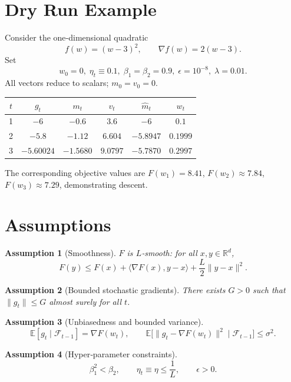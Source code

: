 \documentclass{article}
\newtheorem{assumption}{Assumption}
\newcommand{\E}{\mathbb{E}}
\newcommand{\R}{\mathbb{R}}
\begin{document}
\section*{Dry Run Example}
Consider the one‑dimensional quadratic
\[
f(w)=(w-3)^2,\qquad \nabla f(w)=2(w-3).
\]
Set
\[
w_0=0,\;\eta_t\equiv0.1,\;
\beta_1=\beta_2=0.9,\;
\epsilon=10^{-8},\;
\lambda=0.01.
\]
All vectors reduce to scalars; $m_0=v_0=0$.

\begin{center}
\begin{tabular}{c|c|c|c|c|c}
$t$ & $g_t$ & $m_t$ & $v_t$ & $\hat m_t$ & $w_t$ \\ \hline
1 & $-6$ & $-0.6$ & $3.6$ & $-6$ & $0.1$ \\
2 & $-5.8$ & $-1.12$ & $6.604$ & $-5.8947$ & $0.1999$ \\
3 & $-5.60024$ & $-1.5680$ & $9.0797$ & $-5.7870$ & $0.2997$
\end{tabular}
\end{center}
The corresponding objective values are $F(w_1)=8.41$, $F(w_2)\approx7.84$, $F(w_3)\approx7.29$, demonstrating descent.

\section*{Assumptions}
\begin{assumption}[Smoothness]\label{ass:smooth}
$F$ is $L$‑smooth: for all $x,y\in\R^d$,
\[
F(y)\le F(x)+\langle \nabla F(x),y-x\rangle+\frac{L}{2}\|y-x\|^2 .
\]
\end{assumption}
\begin{assumption}[Bounded stochastic gradients]\label{ass:bound}
There exists $G>0$ such that $\|g_t\|\le G$ almost surely for all $t$.
\end{assumption}
\begin{assumption}[Unbiasedness and bounded variance]\label{ass:var}
\[
\E[g_t\mid\mathcal{F}_{t-1}]=\nabla F(w_t),\qquad
\E\bigl[\|g_t-\nabla F(w_t)\|^2\mid\mathcal{F}_{t-1}\bigr]\le\sigma^2 .
\]
\end{assumption}
\begin{assumption}[Hyper‑parameter constraints]\label{ass:hyper}
\[
\beta_1^2 < \beta_2,\qquad
\eta_t\equiv\eta\le \frac{1}{L},\qquad
\epsilon>0 .
\]
\end{assumption}
\end{document}
